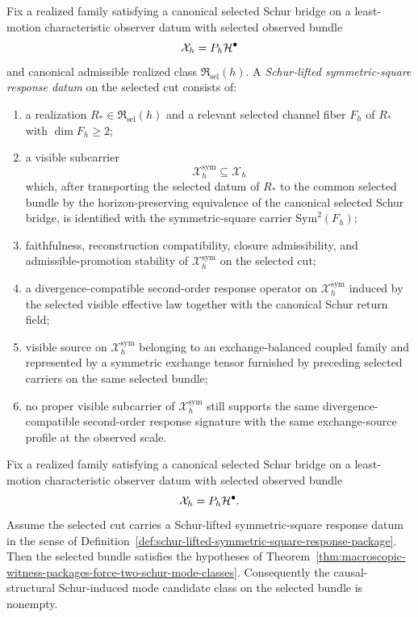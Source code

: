 \begin{definition}
\label{def:schur-lifted-symmetric-square-response-package}
Fix a realized family satisfying a canonical selected Schur bridge on a
least-motion characteristic observer datum with selected observed bundle
\[
\mathcal X_h=P_h\mathcal{H}^\bullet
\]
and canonical admissible realized class \(\mathfrak R_{\mathrm{sel}}(h)\). A
\emph{Schur-lifted symmetric-square response datum} on the selected cut
consists of:
\begin{enumerate}[label=(\roman*), leftmargin=2em, itemsep=0.2em]
\item a realization \(R_\ast\in\mathfrak R_{\mathrm{sel}}(h)\) and a relevant
      selected channel fiber \(F_h\) of \(R_\ast\) with \(\dim F_h\ge 2\);
\item a visible subcarrier
      \[
      \mathcal X_h^{\mathrm{sym}}\subseteq \mathcal X_h
      \]
      which, after transporting the selected datum of \(R_\ast\) to the common
      selected bundle by the horizon-preserving equivalence of the canonical
      selected Schur bridge, is identified with the symmetric-square carrier
      \(\mathrm{Sym}^2(F_h)\);
\item faithfulness, reconstruction compatibility, closure admissibility, and
      admissible-promotion stability of
      \(\mathcal X_h^{\mathrm{sym}}\) on the selected cut;
\item a divergence-compatible second-order response operator on
      \(\mathcal X_h^{\mathrm{sym}}\) induced by the selected visible effective
      law together with the canonical Schur return field;
\item visible source on \(\mathcal X_h^{\mathrm{sym}}\) belonging to an
      exchange-balanced coupled family and represented by a symmetric exchange
      tensor furnished by preceding selected carriers on the same selected
      bundle;
\item no proper visible subcarrier of \(\mathcal X_h^{\mathrm{sym}}\) still
      supports the same divergence-compatible second-order response signature
      with the same exchange-source profile at the observed scale.
\end{enumerate}
\end{definition}

\begin{theorem}
\label{thm:schur-lifted-symmetric-square-response-forces-geometric-witness}
Fix a realized family satisfying a canonical selected Schur bridge on a
least-motion characteristic observer datum with selected observed bundle
\[
\mathcal X_h=P_h\mathcal{H}^\bullet.
\]
Assume the selected cut carries a Schur-lifted symmetric-square response
datum in the sense of
Definition~\ref{def:schur-lifted-symmetric-square-response-package}. Then the
selected bundle satisfies the hypotheses of
Theorem~\ref{thm:macroscopic-witness-packages-force-two-schur-mode-classes}.
Consequently the causal-structural Schur-induced mode candidate class on the
selected bundle is nonempty.
\end{theorem}

